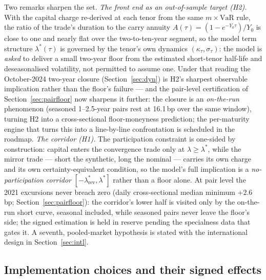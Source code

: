 \documentclass[11pt]{article}
\newcommand{\VaR}{\mathrm{VaR}}
\begin{document}
Two remarks sharpen the set. \emph{The front end as an out-of-sample target (H2).} With the capital charge re-derived at each tenor from the same $m\times\VaR$ rule, the ratio of the trade's duration to the carry annuity $A(\tau)=(1-e^{-Y_0\tau})/Y_0$ is close to one and nearly flat over the two-to-ten-year segment, so the model term structure $\lambda^*(\tau)$ is governed by the tenor's own dynamics $(\kappa_\tau,\sigma_\tau)$: the model is \emph{asked} to deliver a small two-year floor from the estimated short-tenor half-life and deseasonalised volatility, not permitted to assume one. Under that reading the October-2024 two-year closure (Section~\ref{sec:dyn}) is H2's sharpest observable implication rather than the floor's failure --- and the pair-level certification of Section~\ref{sec:pairfloor} now sharpens it further: the closure is an \emph{on-the-run} phenomenon (seasoned 1--2.5-year pairs rest at 16.1\,bp over the same window), turning H2 into a cross-sectional floor-moneyness prediction; the per-maturity engine that turns this into a line-by-line confrontation is scheduled in the roadmap. \emph{The corridor (H1).} The participation constraint is one-sided by construction: capital enters the convergence trade only at $\lambda\ge\lambda^*$, while the mirror trade --- short the synthetic, long the nominal --- carries its own charge and its own certainty-equivalent condition, so the model's full implication is a \emph{no-participation corridor} $[-\lambda^*_{\text{rev}},\lambda^*]$ rather than a floor alone. At pair level the 2021 excursions never breach zero (daily cross-sectional median minimum $+2.6$\,bp; Section~\ref{sec:pairfloor}): the corridor's lower half is visited only by the on-the-run short curve, seasonal included, while seasoned pairs never leave the floor's side; the signed estimation is held in reserve pending the specialness data that gates it. A seventh, pooled-market hypothesis is stated with the international design in Section~\ref{sec:intl}.

\subsection{Implementation choices and their signed effects}
\end{document}
